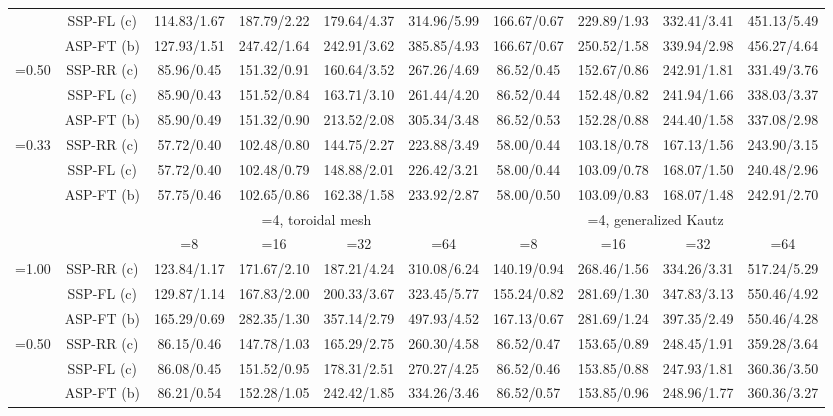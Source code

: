 \documentclass[10pt,twocolumn,journal]{IEEEtran}
\begin{document}
\begin{table*}[t!]
{\begin{tabular}{|c|c|c|c|c|c|c|c|c|c|}
& SSP-FL (c) & 114.83/1.67 & 187.79/2.22 & 179.64/4.37 & 314.96/5.99 & 166.67/0.67 & 229.89/1.93 & 332.41/3.41 & 451.13/5.49 \\
& ASP-FT (b) & 127.93/1.51 & 247.42/1.64 & 242.91/3.62 & 385.85/4.93 & 166.67/0.67 & 250.52/1.58 & 339.94/2.98 & 456.27/4.64 \\
\hline
\multirow{3}{*}{=0.50} & SSP-RR (c) & 85.96/0.45 & 151.32/0.91 & 160.64/3.52 & 267.26/4.69 & 86.52/0.45 & 152.67/0.86 & 242.91/1.81 & 331.49/3.76 \\
& SSP-FL (c) & 85.90/0.43 & 151.52/0.84 & 163.71/3.10 & 261.44/4.20 & 86.52/0.44 & 152.48/0.82 & 241.94/1.66 & 338.03/3.37 \\
& ASP-FT (b) & 85.90/0.49 & 151.32/0.90 & 213.52/2.08 & 305.34/3.48 & 86.52/0.53 & 152.28/0.88 & 244.40/1.58 & 337.08/2.98 \\
\hline
\multirow{3}{*}{=0.33} & SSP-RR (c) & 57.72/0.40 & 102.48/0.80 & 144.75/2.27 & 223.88/3.49 & 58.00/0.44 & 103.18/0.78 & 167.13/1.56 & 243.90/3.15 \\
& SSP-FL (c) & 57.72/0.40 & 102.48/0.79 & 148.88/2.01 & 226.42/3.21 & 58.00/0.44 & 103.09/0.78 & 168.07/1.50 & 240.48/2.96 \\
& ASP-FT (b) & 57.75/0.46 & 102.65/0.86 & 162.38/1.58 & 233.92/2.87 & 58.00/0.50 & 103.09/0.83 & 168.07/1.48 & 242.91/2.70 \\
\hline
\hline
& 	 & \multicolumn{4}{c|}{=4, toroidal mesh} & \multicolumn{4}{c|}{=4, generalized Kautz} \\
\hline
& 	 & =8 & =16 & =32 & =64 & =8 & =16 & =32 & =64 \\
\hline
\multirow{3}{*}{=1.00} & SSP-RR (c) & 123.84/1.17 & 171.67/2.10 & 187.21/4.24 & 310.08/6.24 & 140.19/0.94 & 268.46/1.56 & 334.26/3.31 & 517.24/5.29 \\
& SSP-FL (c) & 129.87/1.14 & 167.83/2.00 & 200.33/3.67 & 323.45/5.77 & 155.24/0.82 & 281.69/1.30 & 347.83/3.13 & 550.46/4.92 \\
& ASP-FT (b) & 165.29/0.69 & 282.35/1.30 & 357.14/2.79 & 497.93/4.52 & 167.13/0.67 & 281.69/1.24 & 397.35/2.49 & 550.46/4.28 \\
\hline
\multirow{3}{*}{=0.50} & SSP-RR (c) & 86.15/0.46 & 147.78/1.03 & 165.29/2.75 & 260.30/4.58 & 86.52/0.47 & 153.65/0.89 & 248.45/1.91 & 359.28/3.64 \\
& SSP-FL (c) & 86.08/0.45 & 151.52/0.95 & 178.31/2.51 & 270.27/4.25 & 86.52/0.46 & 153.85/0.88 & 247.93/1.81 & 360.36/3.50 \\
& ASP-FT (b) & 86.21/0.54 & 152.28/1.05 & 242.42/1.85 & 334.26/3.46 & 86.52/0.57 & 153.85/0.96 & 248.96/1.77 & 360.36/3.27 \\

\end{tabular}}
\end{table*}
\end{document}
